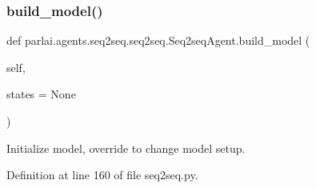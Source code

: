 \subsubsection{\texorpdfstring{build\+\_\+model()}{build\_model()}}
{\footnotesize\ttfamily def parlai.\+agents.\+seq2seq.\+seq2seq.\+Seq2seq\+Agent.\+build\+\_\+model (\begin{DoxyParamCaption}\item[{}]{self,  }\item[{}]{states = {\ttfamily None} }\end{DoxyParamCaption})}

\begin{DoxyVerb}Initialize model, override to change model setup.
\end{DoxyVerb}
 

Definition at line 160 of file seq2seq.\+py.


